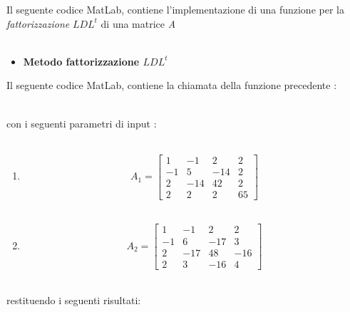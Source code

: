 \graphicspath{ {assets/cap3/es_2/} }

Il seguente codice MatLab, contiene l'implementazione di una funzione per la \textit{fattorizzazione} $LDL^t$ di una matrice \textit{A}\\\
\begin{itemize}
	\item \textbf{Metodo fattorizzazione $LDL^t$}
	      
\end{itemize}
Il seguente codice MatLab, contiene la chiamata della funzione precedente :\\\

con i seguenti parametri di input :\\\
\begin{enumerate}
	\item
	      \[
	      	A_1 =\begin{bmatrix}
	      	1  & -1  & 2   & 2  \\ 
	      	-1 & 5   & -14 & 2  \\
	      	2  & -14 & 42  & 2  \\
	      	2  & 2   & 2   & 65 
	      	\end{bmatrix}
	      \]\\
	\item
	      \[
	      	A_2 =\begin{bmatrix}
	      	1  & -1  & 2   & 2   \\ 
	      	-1 & 6   & -17 & 3   \\
	      	2  & -17 & 48  & -16 \\
	      	2  & 3   & -16 & 4   
	      	\end{bmatrix}
	      \]\\
\end{enumerate}
restituendo i seguenti risultati:\\\
